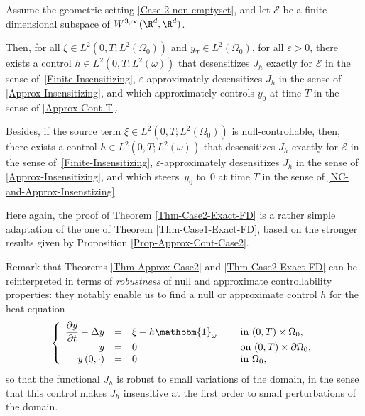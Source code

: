 \begin{theorem}
\label{Thm-Case2-Exact-FD}
Assume the geometric setting \eqref{Case-2-non-emptyset}, and let $\mathcal{E}$ be a finite-dimensional subspace of $W^{3, \infty}(\R^d, \R^d)$.

Then, for all $ \xi \in L^2(0,T; L^2(\Omega_0))$ and $y_T \in L^2(\Omega_0)$, for all $\varepsilon>0$, there exists a control $h\in L^2(0,T; L^2(\omega))$ that desensitizes $J_h$ exactly for $\mathcal{E}$ in the sense of~\eqref{Finite-Insensitizing}, $\varepsilon$\nobreakdash-approximately desensitizes $J_h$ in the sense of \eqref{Approx-Insensitizing}, and which approximately controls $y_0$ at time $T$ in the sense of \eqref{Approx-Cont-T}.

Besides, if {the source term} $ \xi\!\in\!L^2(0,T; L^2(\Omega_0))$ is null-controllable, then, there exists a control $h\!\in\!L^2(0,T; L^2(\omega))$ that desensitizes $J_h$ exactly for $\mathcal{E}$ in the sense of~\eqref{Finite-Insensitizing}, $\varepsilon$-approximately desensitizes $J_h$ in the sense of \eqref{Approx-Insensitizing}, and which steers~$y_0$ to~$0$ at time $T$ in the sense of \eqref{NC-and-Approx-Insenstizing}.
\end{theorem}

Here again, the proof of Theorem \ref{Thm-Case2-Exact-FD} is a rather simple adaptation of the one of Theorem \ref{Thm-Case1-Exact-FD}, based on the stronger results given by Proposition \ref{Prop-Approx-Cont-Case2}.
\begin{remark}
Remark that Theorems \ref{Thm-Approx-Case2} and \ref{Thm-Case2-Exact-FD} can be reinterpreted in terms of \textit{robustness} of null and approximate controllability properties: they notably enable us to find a null or approximate control $h$ for the heat equation
\begin{equation*}
\left\{
\begin{array}{rcll}
\dfrac{\partial y}{\partial t}-\Delta y &=&\xi +h\mathbbm{1}_{\omega}\quad&\text{ in }(0,T) \times \Omega_0,
\\
y &=& 0 &\text{ on }(0,T) \times \partial \Omega_0,
\\
y\left(0,\cdot\right) &=& 0 &\text{ in }\Omega_0,
\end{array}
\right.
\end{equation*}
so that the functional $J_h$ is robust to small variations of the domain, in the sense that this control makes $J_h$ insensitive at the first order to small perturbations of the domain.
\end{remark}

